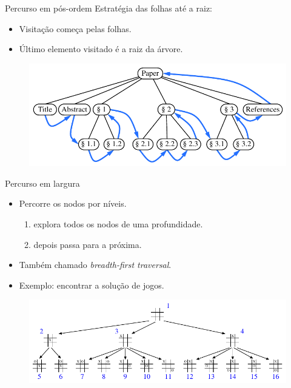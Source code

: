 \begin{frame}{Percurso em pós-ordem}
Estratégia das folhas até a raiz:
\begin{itemize}
	\item Visitação começa pelas folhas.
	\item Último elemento visitado é a raiz da árvore.
\end{itemize}

\medskip

\begin{figure}
	\centering
	\includegraphics[width=0.75\linewidth]{img/figure-8-14}
\end{figure}
\end{frame}


\begin{frame}{Percurso em largura}
\begin{itemize}
	\item Percorre os nodos por níveis.
	\begin{enumerate}
		\item explora todos os nodos de uma profundidade.
		\item depois passa para a próxima.
	\end{enumerate}
	\item Também chamado \textit{breadth-first traversal}.
	\item Exemplo: encontrar a solução de jogos.
\end{itemize}

\medskip

\begin{figure}
	\centering
	\includegraphics[width=0.85\linewidth]{img/figure-8-15}
\end{figure}
\end{frame}


